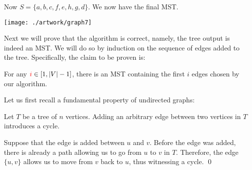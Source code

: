 \documentclass{beamer}
\def\vgap{\vspace{5mm}}
\begin{document}
\begin{frame}
\begin{small}

    Now $S = \{a, b, c, f, e, h, g, d\}$. We now have the final MST. 

    \vgap
    
    \begin{center} 
        \texttt{[image: ./artwork/graph7]} 
    \end{center}
\end{small}    
\end{frame}
\begin{frame}
\begin{small} \label{frm::claim} 
    \begin{tcolorbox}[arc=0mm, colframe=blue!50!black, colback=blue!10!white] 
        Next we will prove that the algorithm is correct, namely, the tree output is indeed an MST. We will do so by induction on the sequence of edges added to the tree. Specifically, the claim to be proven is: 
        
        \vgap 
        
         For any $\textcolor{red}{i} \in [1, |V|-1]$, there is an MST containing  the first $i$ edges chosen by our algorithm.
        

    \end{tcolorbox}
\end{small}    
\end{frame}
\begin{frame} 
\begin{small} 
    
    \vgap 
    
    Let us first recall a fundamental property of undirected graphs: 
    
    \vgap
    
     Let $T$ be a tree of $n$ vertices. Adding an arbitrary edge between two vertices in $T$ introduces a cycle. 
    
    \vgap
    
     Suppose that the edge is added between $u$ and $v$. Before the edge was added, there is already a path allowing us to go from $u$ to $v$ in $T$. Therefore, the edge $\{u, v\}$ allows us to move from $v$ back to $u$, thus witnessing a cycle. \qed
    
    \vgap 
\end{small}     
\end{frame}
\end{document}
